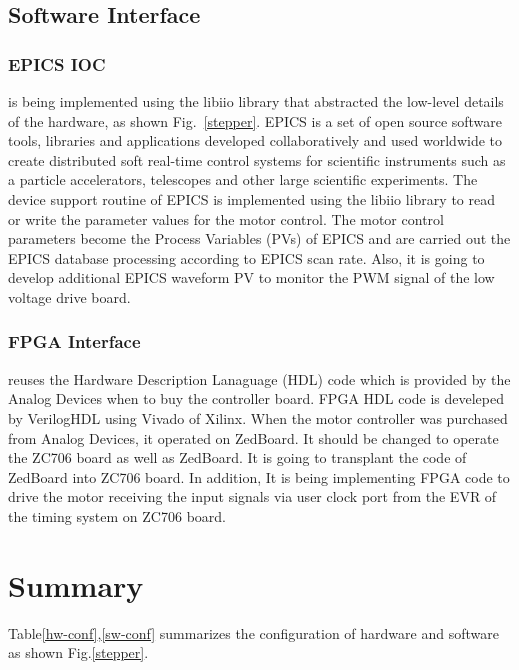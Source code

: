\documentclass[a4paper,
              ]{jacow}
\begin{document}
\subsection{Software Interface}

\subsubsection{EPICS IOC} 
is being implemented using the libiio library that abstracted the low-level details of the hardware, as shown Fig.~\ref{stepper}. EPICS is a set of open source software tools, libraries and applications developed collaboratively and used worldwide to create distributed soft real-time control systems for scientific instruments such as a particle accelerators, telescopes and other large scientific experiments\cite{epics}.
The device support routine of EPICS is implemented using the libiio library to read or write the parameter values for the motor control. The motor control parameters become the Process Variables (PVs) of EPICS and are carried out the EPICS database processing according to EPICS scan rate. Also, it is going to develop additional EPICS waveform PV to monitor the PWM signal of the low voltage drive board.

\subsubsection{FPGA Interface}
reuses the Hardware Description Lanaguage (HDL) code which is provided by the Analog Devices when to buy the controller board. FPGA HDL code is develeped by VerilogHDL using Vivado of Xilinx. When the motor controller was purchased from Analog Devices, it operated on ZedBoard. It should be changed to operate the ZC706 board as well as ZedBoard. It is going to transplant the code of ZedBoard into ZC706 board. In addition, It is being implementing FPGA code to drive the motor receiving the input signals via user clock port from the EVR of the timing system on ZC706 board.


\section{Summary}

Table\ref{hw-conf},\ref{sw-conf} summarizes the configuration of hardware and software as shown Fig.\ref{stepper}.
\end{document}
